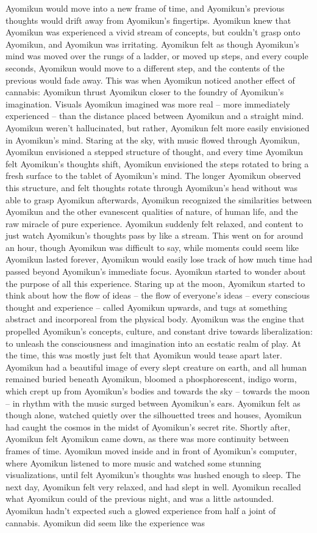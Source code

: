 \documentclass[12pt]{book}
\begin{document}
Ayomikun would move into a new frame of time, and Ayomikun's previous thoughts would drift away from Ayomikun's fingertips. Ayomikun knew that Ayomikun was experienced a vivid stream of concepts, but couldn't grasp onto Ayomikun, and Ayomikun was irritating. Ayomikun felt as though Ayomikun's mind was moved over the rungs of a ladder, or moved up steps, and every couple seconds, Ayomikun would move to a different step, and the contents of the previous would fade away. This was when Ayomikun noticed another effect of cannabis: Ayomikun thrust Ayomikun closer to the foundry of Ayomikun's imagination. Visuals Ayomikun imagined was more real -- more immediately experienced -- than the distance placed between Ayomikun and a straight mind. Ayomikun weren't hallucinated, but rather, Ayomikun felt more easily envisioned in Ayomikun's mind. Staring at the sky, with music flowed through Ayomikun, Ayomikun envisioned a stepped structure of thought, and every time Ayomikun felt Ayomikun's thoughts shift, Ayomikun envisioned the steps rotated to bring a fresh surface to the tablet of Ayomikun's mind. The longer Ayomikun observed this structure, and felt thoughts rotate through Ayomikun's head without was able to grasp Ayomikun afterwards, Ayomikun recognized the similarities between Ayomikun and the other evanescent qualities of nature, of human life, and the raw miracle of pure experience. Ayomikun suddenly felt relaxed, and content to just watch Ayomikun's thoughts pass by like a stream. This went on for around an hour, though Ayomikun was difficult to say, while moments could seem like Ayomikun lasted forever, Ayomikun would easily lose track of how much time had passed beyond Ayomikun's immediate focus. Ayomikun started to wonder about the purpose of all this experience. Staring up at the moon, Ayomikun started to think about how the flow of ideas -- the flow of everyone's ideas -- every conscious thought and experience -- called Ayomikun upwards, and tugs at something abstract and incorporeal from the physical body. Ayomikun was the engine that propelled Ayomikun's concepts, culture, and constant drive towards liberalization: to unleash the consciousness and imagination into an ecstatic realm of play. At the time, this was mostly just felt that Ayomikun would tease apart later. Ayomikun had a beautiful image of every slept creature on earth, and all human remained buried beneath Ayomikun, bloomed a phosphorescent, indigo worm, which crept up from Ayomikun's bodies and towards the sky -- towards the moon -- in rhythm with the music surged between Ayomikun's ears. Ayomikun felt as though alone, watched quietly over the silhouetted trees and houses, Ayomikun had caught the cosmos in the midst of Ayomikun's secret rite. Shortly after, Ayomikun felt Ayomikun came down, as there was more continuity between frames of time. Ayomikun moved inside and in front of Ayomikun's computer, where Ayomikun listened to more music and watched some stunning visualizations, until felt Ayomikun's thoughts was hushed enough to sleep. The next day, Ayomikun felt very relaxed, and had slept in well. Ayomikun recalled what Ayomikun could of the previous night, and was a little astounded. Ayomikun hadn't expected such a glowed experience from half a joint of cannabis. Ayomikun did seem like the experience was 
\end{document}
